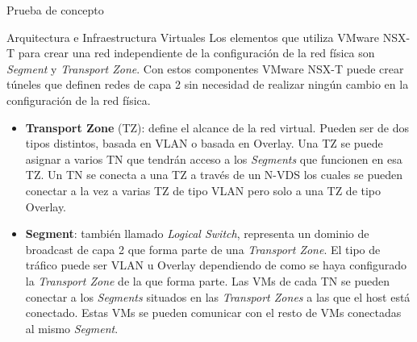 \begin{section}{Prueba de concepto}
\begin{subsection}{Arquitectura e Infraestructura Virtuales\cite{CFVirtInfraes}}
Los elementos que utiliza VMware NSX-T para crear una red independiente de la configuración de la red física son \textit{Segment} y \textit{Transport Zone}. Con estos componentes VMware NSX-T puede crear túneles que definen redes de capa 2 sin necesidad de realizar ningún cambio en la configuración de la red física.
\begin{itemize}
  \item \textbf{Transport Zone} (TZ): define el alcance de la red virtual. Pueden ser de dos tipos distintos, basada en VLAN o basada en Overlay. Una TZ se puede asignar a varios TN que tendrán acceso a los \textit{Segments} que funcionen en esa TZ. Un TN se conecta a una TZ a través de un N-VDS los cuales se pueden conectar a la vez a varias TZ de tipo VLAN pero solo a una TZ de tipo Overlay.
  
  \item \textbf{Segment}: también llamado \textit{Logical Switch}, representa un dominio de broadcast de capa 2 que forma parte de una \textit{Transport Zone}. El tipo de tráfico puede ser VLAN u Overlay dependiendo de como se haya configurado la \textit{Transport Zone} de la que forma parte. Las VMs de cada TN se pueden conectar a los \textit{Segments} situados en las \textit{Transport Zones} a las que el host está conectado. Estas VMs se pueden comunicar con el resto de VMs conectadas al mismo \textit{Segment}.
   
\end{itemize}


\end{subsection}
\end{section}
